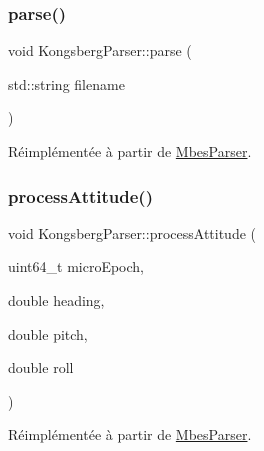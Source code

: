 \mbox{\label{classKongsbergParser_af7c31817a75fc4d153945f35f08b9d99}} 
\subsubsection{\texorpdfstring{parse()}{parse()}}
{\footnotesize\ttfamily void Kongsberg\+Parser\+::parse (\begin{DoxyParamCaption}\item[{std\+::string}]{filename }\end{DoxyParamCaption})\hspace{0.3cm}{\ttfamily [virtual]}}



Réimplémentée à partir de \hyperlink{classMbesParser_a10e172520c1ca2b87dab51aef9e57c2a}{Mbes\+Parser}.

\mbox{\label{classKongsbergParser_aa241961b762eb4fed4702a337573d46d}} 
\subsubsection{\texorpdfstring{process\+Attitude()}{processAttitude()}}
{\footnotesize\ttfamily void Kongsberg\+Parser\+::process\+Attitude (\begin{DoxyParamCaption}\item[{uint64\+\_\+t}]{micro\+Epoch,  }\item[{double}]{heading,  }\item[{double}]{pitch,  }\item[{double}]{roll }\end{DoxyParamCaption})\hspace{0.3cm}{\ttfamily [virtual]}}



Réimplémentée à partir de \hyperlink{classMbesParser_a347e78a8a1369c1ea6e63e7eea474b31}{Mbes\+Parser}.

\mbox{\label{classKongsbergParser_a2404c01d8852893a2b93e68b2841ba66}} 

